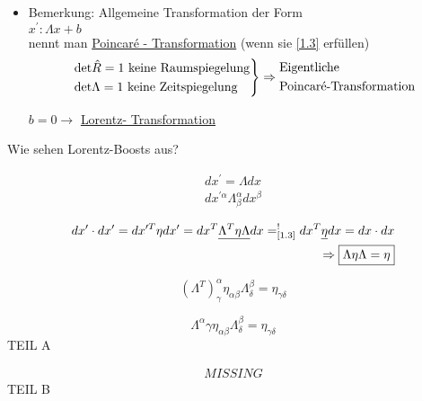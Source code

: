 \documentclass[a4paper, 11pt]{article}
\numberwithin{equation}{section}
\begin{document}
\begin{itemize}
\item Bemerkung: Allgemeine Transformation der Form\\
$x^\prime: \Lambda x + b$\\
nennt man \underline{Poincaré - Transformation} (wenn sie \ref{1.3} erfüllen)
\begin{equation*}
\begin{rcases*}
\text{det}\hat{R} = 1 \text{ keine Raumspiegelung} \\
\text{det}\Lambda = 1 \text{ keine Zeitspiegelung} 
\end{rcases*} \Rightarrow
\begin{aligned}
 &\text{Eigentliche } \\ &\text{Poincaré-Transformation}
\end{aligned}
\end{equation*}


$b=0 \rightarrow$ \underline{Lorentz- Transformation}
\end{itemize}

Wie sehen Lorentz-Boosts aus?

\begin{equation}
\begin{aligned}
dx^\prime = \Lambda dx \\
dx^{\prime \alpha}\Lambda^\alpha_\beta dx^\beta
\end{aligned}
\end{equation}

\begin{equation}
\begin{aligned}
dx^\prime \cdot dx^\prime = dx^{\prime T} \eta dx^\prime = dx^T \underline{\Lambda^T \eta  \Lambda} dx =^!_\text{\ref{1.3}} dx^T \underline{\eta} dx = dx \cdot dx \\
\Rightarrow \boxed{\Lambda \eta \Lambda = \eta}
\end{aligned}
\end{equation}

\begin{equation*}
\left( \Lambda^T \right)_\gamma^\alpha \eta_{\alpha \beta} \Lambda^\beta_\delta = \eta_{\gamma\delta}
\end{equation*}

\begin{equation}
\boxed{
\Lambda^\alpha \gamma \eta_{\alpha \beta} \Lambda^\beta_\delta = \eta_{\gamma\delta}
}
\end{equation}
TEIL A

\begin{equation*}
\begin{aligned}
MISSING
\end{aligned}
\end{equation*}
TEIL B
\end{document}

